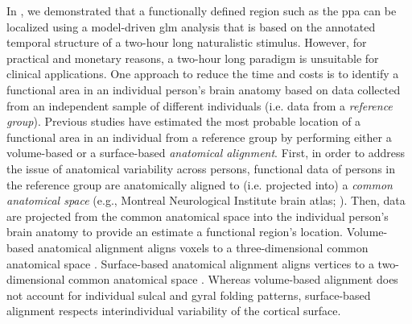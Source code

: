 In \citet{haeusler2022processing}, we demonstrated that a functionally defined
region such as the \ac{ppa} can be localized using a model-driven \ac{glm}
analysis that is based on the annotated temporal structure of a two-hour long
naturalistic stimulus.
However, for practical and monetary reasons, a two-hour long paradigm is
unsuitable for clinical applications.
One approach to reduce the time and costs is to identify a functional area in an
individual person's brain anatomy based on data collected from an independent
sample of different individuals (i.e. data from a \textit{reference group}).
Previous studies have estimated the most probable location of a functional area
in an individual from a reference group by performing either a volume-based
\citep[e.g.,][]{zhen2017quantifying, zhen2015quantifying} or a surface-based
\citep[e.g.,][]{frost2012measuring, weiner2018defining,
rosenke2021probabilistic, wang2015probabilistic} \textit{anatomical alignment}.
%
First, in order to address the issue of anatomical variability across persons,
functional data of persons in the reference group are anatomically aligned to
(i.e.  projected into) a \textit{common anatomical space} (e.g., Montreal
Neurological Institute brain atlas; \citep[MNI152,][]{fonov2011unbiased}).
Then, data are projected from the common anatomical space into the
individual person's brain anatomy to provide an estimate a functional region's
location.
Volume-based anatomical alignment \citep[s.][for a review]{klein2009evaluation}
aligns voxels to a three-dimensional common anatomical space \citep[e.g., MNI152
atlas;][]{fonov2011unbiased}.
Surface-based anatomical alignment \citep{fischl1999cortical, yeo2009spherical}
aligns vertices to a two-dimensional common anatomical space \citep[e.g.,
FreeSurfer's fsaverage template;][]{fischl1999high}.
Whereas volume-based alignment does not account for individual sulcal and gyral
folding patterns, surface-based alignment respects interindividual variability
of the cortical surface.
